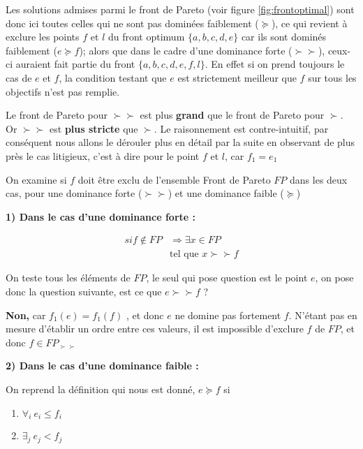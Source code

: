 Les solutions admises parmi le front de Pareto (voir figure \ref{fig:frontoptimal}) sont donc ici toutes celles qui ne sont pas dominées faiblement ($\succeq$), ce qui revient à exclure les points $f$ et $l$ du front optimum $\{a,b,c,d,e\}$ car ils sont dominés faiblement ($e \succeq f$); alors que dans le cadre d'une dominance forte ($\succ \succ$), ceux-ci auraient fait partie du front $\{a,b,c,d,e,f,l\}$. En effet si on prend toujours le cas de $e$ et $f$, la condition testant que $e$ est strictement meilleur que $f$ sur tous les objectifs n'est pas remplie. 


Le front de Pareto pour $\succ \succ$ est plus \textbf{grand} que le front de Pareto pour $ \succ $. Or $\succ \succ$ est \textbf{plus stricte} que $\succ$. Le raisonnement est contre-intuitif, par conséquent nous allons le dérouler plus en détail par la suite en observant de plus près le cas litigieux, c'est à dire pour le point $f$ et $l$, car $f_1 = e_1$

On examine si $f$ doit être exclu de l'ensemble Front de Pareto $FP$ dans les deux cas, pour une dominance forte ($\succ \succ$) et une dominance faible ($\succeq$)

\textbf{1) Dans le cas d'une dominance forte : }

\begin{align*}
     si f \notin FP & \Rightarrow \exists x \in FP \\
     & \text{tel que }  x \succ \succ f
\end{align*}

On teste tous les éléments de $FP$, le seul qui pose question est le point $e$, on pose donc la question suivante, est ce que $e \succ \succ f$ ?

\textbf{Non,} car $f_1(e) = f_1(f)$ , et donc $e$ ne domine pas fortement $f$. N'étant pas en mesure d'établir un ordre entre ces valeurs, il est impossible d'exclure $f$ de $FP$, et donc $ f \in FP_{\succ \succ}$

\textbf{2) Dans le cas d'une dominance faible : }

On reprend la définition qui nous est donné, $ e \succeq f$ si
\begin{enumerate}[label=(\arabic*),labelindent=\parindent,leftmargin=*]
\item $ \forall_i \ e_i \leq f_i$
\item $ \exists_j \ e_j < f_j$
\end{enumerate}

